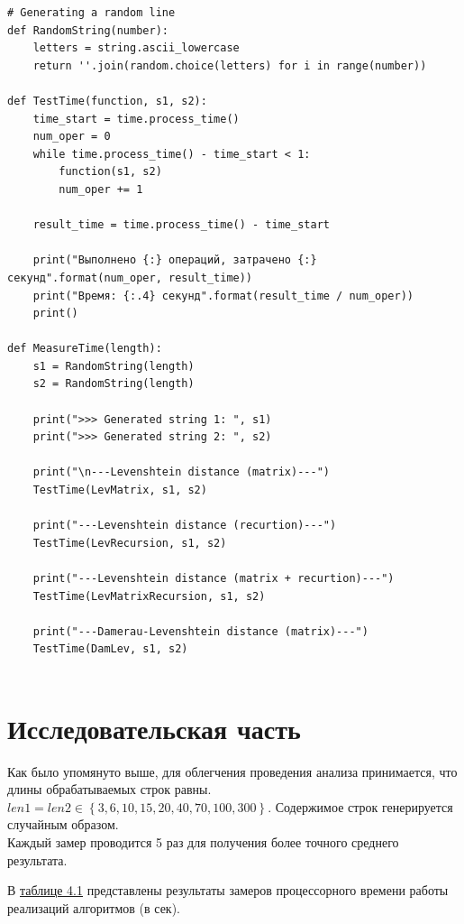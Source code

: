 \documentclass[12pt]{report}
\begin{document}
\begin{lstlisting}[label=some-code, caption = Замеры процессорного времени]
# Generating a random line
def RandomString(number):
	letters = string.ascii_lowercase
	return ''.join(random.choice(letters) for i in range(number))

def TestTime(function, s1, s2):
	time_start = time.process_time()
	num_oper = 0
	while time.process_time() - time_start < 1:
		function(s1, s2)
		num_oper += 1
	
	result_time = time.process_time() - time_start
	
	print("Выполнено {:} операций, затрачено {:} секунд".format(num_oper, result_time))
	print("Время: {:.4} секунд".format(result_time / num_oper))
	print()

def MeasureTime(length):
	s1 = RandomString(length)
	s2 = RandomString(length)
	
	print(">>> Generated string 1: ", s1)
	print(">>> Generated string 2: ", s2)
	
	print("\n---Levenshtein distance (matrix)---")
	TestTime(LevMatrix, s1, s2)
	
	print("---Levenshtein distance (recurtion)---")
	TestTime(LevRecursion, s1, s2)
	
	print("---Levenshtein distance (matrix + recurtion)---")
	TestTime(LevMatrixRecursion, s1, s2)
	
	print("---Damerau-Levenshtein distance (matrix)---")
	TestTime(DamLev, s1, s2)
	
\end{lstlisting}

\chapter{Исследовательская часть}
Как было упомянуто выше, для облегчения проведения анализа принимается, что длины обрабатываемых строк равны. $len1 = len2 \in \left\lbrace 3, 6, 10, 15, 20, 40, 70, 100, 300\right\rbrace$. Содержимое строк генерируется случайным образом. \\

Каждый замер проводится 5 раз для получения более точного среднего результата.

В \hyperref[table_4_1]{таблице 4.1} представлены результаты замеров процессорного времени работы реализаций алгоритмов (в сек).
\end{document}
